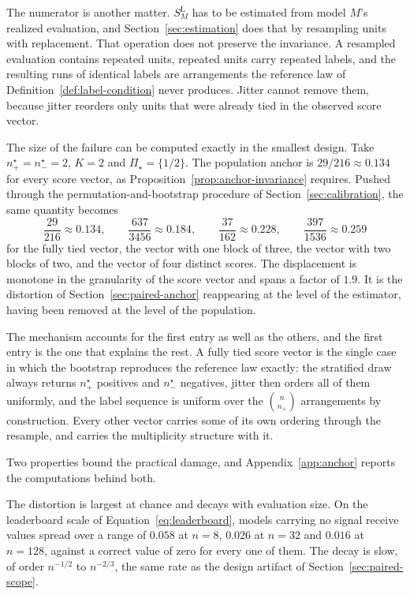 \documentclass[11pt]{article}
\newcommand{\PSet}{\Pi_\star}
\newcommand{\SLead}{S^{\mathrm{L}}}
\theoremstyle{remark}
\begin{document}
The numerator is another matter. $\SLead_M$ has to be estimated from model $M$'s realized evaluation, and Section~\ref{sec:estimation} does that by resampling units with replacement. That operation does not preserve the invariance. A resampled evaluation contains repeated units, repeated units carry repeated labels, and the resulting runs of identical labels are arrangements the reference law of Definition~\ref{def:label-condition} never produces. Jitter cannot remove them, because jitter reorders only units that were already tied in the observed score vector.

The size of the failure can be computed exactly in the smallest design. Take $n^\star_+=n^\star_-=2$, $K=2$ and $\PSet=\{1/2\}$. The population anchor is $29/216\approx0.134$ for every score vector, as Proposition~\ref{prop:anchor-invariance} requires. Pushed through the permutation-and-bootstrap procedure of Section~\ref{sec:calibration}, the same quantity becomes
\[
\frac{29}{216}\approx0.134,
\qquad
\frac{637}{3456}\approx0.184,
\qquad
\frac{37}{162}\approx0.228,
\qquad
\frac{397}{1536}\approx0.259
\]
for the fully tied vector, the vector with one block of three, the vector with two blocks of two, and the vector of four distinct scores. The displacement is monotone in the granularity of the score vector and spans a factor of $1.9$. It is the distortion of Section~\ref{sec:paired-anchor} reappearing at the level of the estimator, having been removed at the level of the population.

The mechanism accounts for the first entry as well as the others, and the first entry is the one that explains the rest. A fully tied score vector is the single case in which the bootstrap reproduces the reference law exactly: the stratified draw always returns $n^\star_+$ positives and $n^\star_-$ negatives, jitter then orders all of them uniformly, and the label sequence is uniform over the $\binom{n}{n_+}$ arrangements by construction. Every other vector carries some of its own ordering through the resample, and carries the multiplicity structure with it.

Two properties bound the practical damage, and Appendix~\ref{app:anchor} reports the computations behind both.

The distortion is largest at chance and decays with evaluation size. On the leaderboard scale of Equation~\eqref{eq:leaderboard}, models carrying no signal receive values spread over a range of $0.058$ at $n=8$, $0.026$ at $n=32$ and $0.016$ at $n=128$, against a correct value of zero for every one of them. The decay is slow, of order $n^{-1/2}$ to $n^{-2/3}$, the same rate as the design artifact of Section~\ref{sec:paired-scope}.
\end{document}
